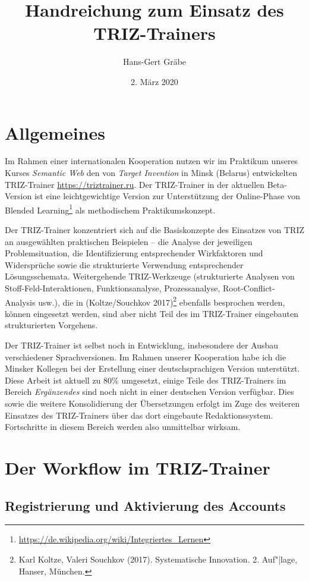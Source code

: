 \documentclass[11pt,a4paper]{article}
\title{Handreichung zum Einsatz des TRIZ-Trainers}
\author{Hans-Gert Gr\"abe}
\date{2. März 2020}
\begin{document}
\maketitle
\tableofcontents

\section{Allgemeines}

Im Rahmen einer internationalen Kooperation nutzen wir im Praktikum unseres
Kurses \emph{Semantic Web} den von \emph{Target Invention} in Minsk (Belarus)
entwickelten TRIZ-Trainer \url{https://triztrainer.ru}.  Der TRIZ-Trainer in
der aktuellen Beta-Version ist eine leichtgewichtige Version zur Unterstützung
der Online-Phase von Blended
Learning\footnote{\url{https://de.wikipedia.org/wiki/Integriertes_Lernen}} als
methodischem Praktikumskonzept.

Der TRIZ-Trainer konzentriert sich auf die Basiskonzepte des Einsatzes von
TRIZ an ausgewählten praktischen Beispielen -- die Analyse der jeweiligen
Problemsituation, die Identifizierung entsprechender Wirkfaktoren und
Widersprüche sowie die strukturierte Verwendung entsprechender
Lösungsschemata.  Weitergehende TRIZ-Werkzeuge (strukturierte Analysen von
Stoff-Feld-Interaktionen, Funktionsanalyse, Prozessanalyse,
Root-Conflict-Analysis usw.), die in (Koltze/Souchkov 2017)\footnote{Karl
  Koltze, Valeri Souchkov (2017). Systematische Innovation.  2. Auf"|lage,
  Hanser, München.} ebenfalls besprochen werden, können eingesetzt werden,
sind aber nicht Teil des im TRIZ-Trainer eingebauten strukturierten Vorgehens.

Der TRIZ-Trainer ist selbst noch in Entwicklung, insbesondere der Ausbau
verschiedener Sprachversionen.  Im Rahmen unserer Kooperation habe ich die
Minsker Kollegen bei der Erstellung einer deutschsprachigen Version
unterstützt.  Diese Arbeit ist aktuell zu 80\% umgesetzt, einige Teile des
TRIZ-Trainers im Bereich \emph{Ergänzendes} sind noch nicht in einer deutschen
Version verfügbar. Dies sowie die weitere Konsolidierung der Übersetzungen
erfolgt im Zuge des weiteren Einsatzes des TRIZ-Trainers über das dort
eingebaute Redaktionssystem.  Fortschritte in diesem Bereich werden also
unmittelbar wirksam.

\section{Der Workflow im TRIZ-Trainer}

\subsection{Registrierung und Aktivierung des Accounts}
\end{document}
